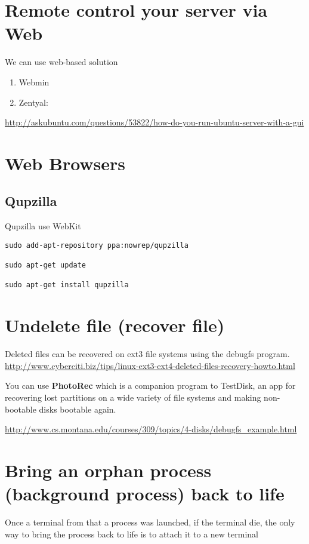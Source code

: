 \section{Remote control your server via Web}

We can use web-based solution
\begin{enumerate}
  \item Webmin
  \item Zentyal: 
\end{enumerate}
\url{http://askubuntu.com/questions/53822/how-do-you-run-ubuntu-server-with-a-gui}


\section{Web Browsers}

\subsection{Qupzilla}


Qupzilla use WebKit
\begin{verbatim}
sudo add-apt-repository ppa:nowrep/qupzilla

sudo apt-get update

sudo apt-get install qupzilla
\end{verbatim}


\section{Undelete file (recover file)}
\label{sec:debugfs_utility}

Deleted files can be recovered on ext3 file systems using the debugfs program.
\url{http://www.cyberciti.biz/tips/linux-ext3-ext4-deleted-files-recovery-howto.html}




You can use {\bf PhotoRec} which is a companion program to TestDisk, an app for
recovering lost partitions on a wide variety of file systems and making
non-bootable disks bootable again.

\url{http://www.cs.montana.edu/courses/309/topics/4-disks/debugfs_example.html}

\section{Bring an orphan process (background process) back to life}
\label{sec:reptyr}

Once a terminal from that a process was launched, if the terminal die, the only
way to bring the process back to life is to attach it to a new terminal

